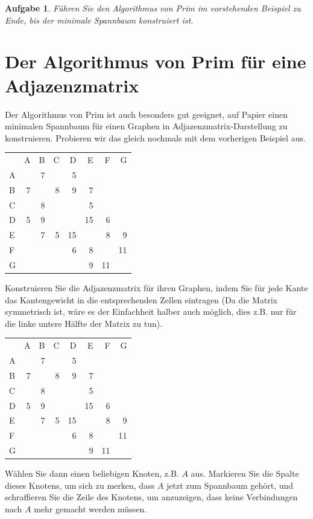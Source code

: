 \documentclass[12pt,a4paper]{report}
\theoremstyle{break}
\newtheorem{exercise}{Aufgabe}[chapter]
\theoremstyle{plain}
\newcommand{\ucl}{\ding{56}}
\newcommand{\ign}{\rowcolor[gray]{0.5}}
\newcommand{\matrixstep}[2]{\noindent\parbox{6cm}{\scriptsize #1}
  \hfill
  \parbox{7cm}{\small #2}
  \vskip 2mm
}
\begin{document}
\begin{exercise}\label{exprim}
F\"{u}hren Sie den Algorithmus von Prim im vorstehenden Beispiel zu
Ende, bis der minimale Spannbaum konstruiert ist.
\end{exercise}

\newpage
\section{Der Algorithmus von Prim f\"{u}r eine Adjazenzmatrix}

Der Algorithmus von Prim ist auch besonders gut geeignet, auf Papier einen
minimalen Spannbaum f\"{u}r einen Graphen in
Adjazenzmatrix-Darstellung zu konstruieren. Probieren wir das gleich
nochmals mit dem vorherigen Beispiel aus.

\vskip 5mm\matrixstep{
\begin{tabular}{|l|r|r|r|r|r|r|r|}\hline
   &   &   &   &   &   &   &   \\ \hline
   & A & B & C & D & E & F & G \\ \hline
A &   & 7 &   & 5 &   &    &    \\
B & 7 &   & 8 & 9 & 7 &   &   \\
C &   & 8 &   &   & 5 &   &   \\
D & 5 & 9 &   &   &15 & 6 &   \\
E &   & 7 & 5 &15 &   & 8 & 9 \\
F &   &   &   & 6 & 8 &   &11 \\
G &   &   &   &   & 9 &11 & \\ 
\hline
\end{tabular}}{
Konstruieren Sie die Adjazenzmatrix f\"{u}r ihren Graphen, indem Sie
f\"{u}r jede Kante das Kantengewicht in die entsprechenden Zellen
eintragen (Da die Matrix symmetrisch ist, w\"{a}re es der Einfachheit
halber auch m\"{o}glich, dies z.B. nur f\"{u}r die linke untere
H\"{a}lfte der Matrix zu tun).
}
\matrixstep{
\begin{tabular}{|l|r|r|r|r|r|r|r|}\hline
   & \ucl &   &   &   &   &   &   \\ \hline
   & A & B & C & D & E & F & G \\ \hline
\ign A &   & 7 &   & 5 &   &    &    \\
B & 7 &   & 8 & 9 & 7 &   &   \\
C &   & 8 &   &   & 5 &   &   \\
D & 5 & 9 &   &   &15 & 6 &   \\
E &   & 7 & 5 &15 &   & 8 & 9 \\
F &   &   &   & 6 & 8 &   &11 \\
G &   &   &   &   & 9 &11 & \\ 
\hline
\end{tabular}}{
W\"{a}hlen Sie dann einen beliebigen Knoten, z.B. $A$ aus. Markieren
Sie die Spalte dieses Knotens, um sich zu merken, dass $A$
jetzt zum Spannbaum geh\"{o}rt, und schraffieren Sie die Zeile des Knotens, um
anzuzeigen, dass keine Verbindungen nach $A$ mehr gemacht werden m\"{u}ssen.
}
\end{document}
